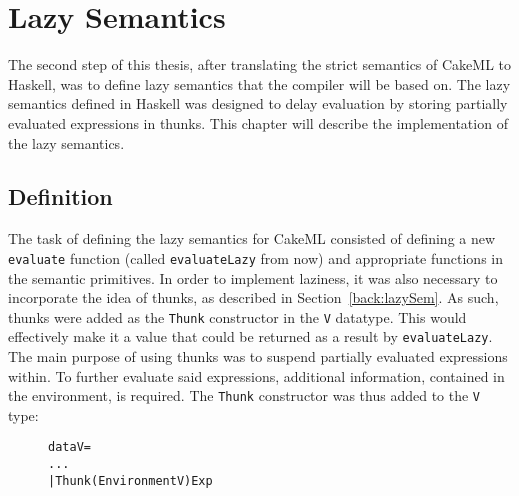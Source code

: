 \chapter{Lazy Semantics}
\label{lazySem}
The second step of this thesis, after translating the strict semantics of CakeML
to Haskell, was to define lazy semantics that the compiler will be based on.
The lazy semantics defined in Haskell was designed to delay evaluation by
storing partially evaluated expressions in thunks. This chapter will describe
the implementation of the lazy semantics.

\section{Definition}
\label{lazySem:impl}

The task of defining the lazy semantics for CakeML consisted of defining a new
\texttt{evaluate} function (called \texttt{evaluateLazy} from now) and
appropriate functions in the semantic primitives.
In order to implement laziness, it was also necessary to incorporate the idea of
thunks, as described in Section~\ref{back:lazySem}. As such, thunks were added
as the \texttt{Thunk} constructor in the \texttt{V} datatype. This would
effectively make it a value that could be returned as a result by
\texttt{evaluateLazy}. The main purpose of using thunks was to suspend partially
evaluated expressions within. To further evaluate said expressions, additional
information, contained in the environment, is required.
The \texttt{Thunk} constructor was thus added to the \texttt{V} type:

\begin{figure}[H]
\begin{alltt}
  data V =
    ...
    | Thunk (Environment V) Exp
\end{alltt}
\end{figure}

